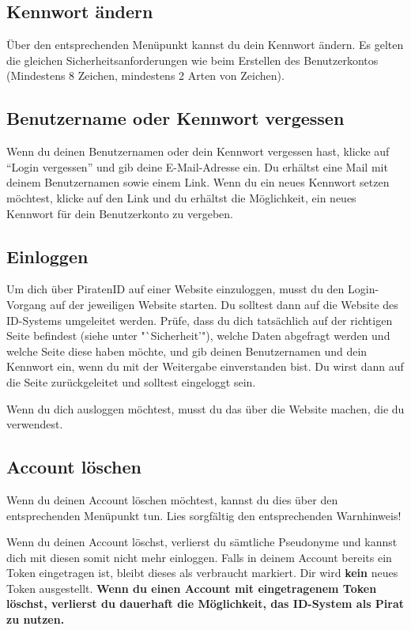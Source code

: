 \subsection{Kennwort ändern}
Über den entsprechenden Menüpunkt kannst du dein Kennwort ändern.
Es gelten die gleichen Sicherheitsanforderungen wie beim Erstellen des Benutzerkontos (Mindestens 8 Zeichen, mindestens 2 Arten von Zeichen).

\subsection{Benutzername oder Kennwort vergessen}
Wenn du deinen Benutzernamen oder dein Kennwort vergessen hast, klicke auf "`Login vergessen"' und gib deine E-Mail-Adresse ein.
Du erhältst eine Mail mit deinem Benutzernamen sowie einem Link.
Wenn du ein neues Kennwort setzen möchtest, klicke auf den Link und du erhältst die Möglichkeit, ein neues Kennwort für dein Benutzerkonto zu vergeben.

\subsection{Einloggen}
Um dich über PiratenID auf einer Website einzuloggen, musst du den Login-Vorgang auf der jeweiligen Website starten.
Du solltest dann auf die Website des ID-Systems umgeleitet werden.
Prüfe, dass du dich tatsächlich auf der richtigen Seite befindest (siehe unter "`Sicherheit'"),
welche Daten abgefragt werden und welche Seite diese haben möchte,
und gib deinen Benutzernamen und dein Kennwort ein, wenn du mit der Weitergabe einverstanden bist.
Du wirst dann auf die Seite zurückgeleitet und solltest eingeloggt sein.

Wenn du dich ausloggen möchtest, musst du das über die Website machen, die du verwendest.

\subsection{Account löschen}
Wenn du deinen Account löschen möchtest, kannst du dies über den entsprechenden Menüpunkt tun.
Lies sorgfältig den entsprechenden Warnhinweis!

Wenn du deinen Account löschst, verlierst du sämtliche Pseudonyme und kannst dich mit diesen somit nicht mehr einloggen.
Falls in deinem Account bereits ein Token eingetragen ist, bleibt dieses als verbraucht markiert.
Dir wird \textbf{kein} neues Token ausgestellt.
\textbf{Wenn du einen Account mit eingetragenem Token löschst, verlierst du dauerhaft die Möglichkeit, das ID-System als Pirat zu nutzen.}

